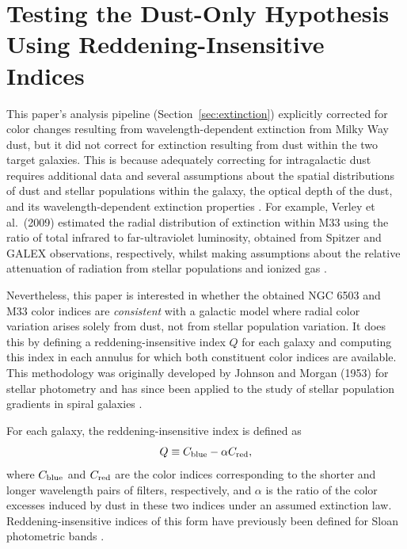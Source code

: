 \section{Testing the Dust-Only Hypothesis Using Reddening-Insensitive Indices}
\label{sec:dust-only}

This paper's analysis pipeline (Section~\ref{sec:extinction}) explicitly corrected for color changes resulting from wavelength-dependent extinction from Milky Way dust, but it did not correct for extinction resulting from dust within the two target galaxies. This is because adequately correcting for intragalactic dust requires additional data and several assumptions about the spatial distributions of dust and stellar populations within the galaxy, the optical depth of the dust, and its wavelength-dependent extinction properties \cite{SalimNarayanan2020}. For example, Verley et al.\ (2009) estimated the radial distribution of extinction within M33 using the ratio of total infrared to far-ultraviolet luminosity, obtained from Spitzer and GALEX observations, respectively, whilst making assumptions about the relative attenuation of radiation from stellar populations and ionized gas \cite{Verley2009}.

Nevertheless, this paper is interested in whether the obtained NGC 6503 and M33 color indices are \textit{consistent} with a galactic model where radial color variation arises solely from dust, not from stellar population variation. It does this by defining a reddening-insensitive index $Q$ for each galaxy and computing this index in each annulus for which both constituent color indices are available. This methodology was originally developed by Johnson and Morgan (1953) for stellar photometry and has since been applied to the study of stellar population gradients in spiral galaxies \cite{JohnsonMorgan1953,GonzalezGraham1996}.

For each galaxy, the reddening-insensitive index is defined as
\begin{equation}
    Q \equiv C_{\rm blue} - \alpha C_{\rm red},
\end{equation}
where $C_{\rm blue}$ and $C_{\rm red}$ are the color indices corresponding to the shorter and longer wavelength pairs of filters, respectively, and $\alpha$ is the ratio of the color excesses induced by dust in these two indices under an assumed extinction law. Reddening-insensitive indices of this form have previously been defined for Sloan photometric bands \cite{Abazajian2009}.

